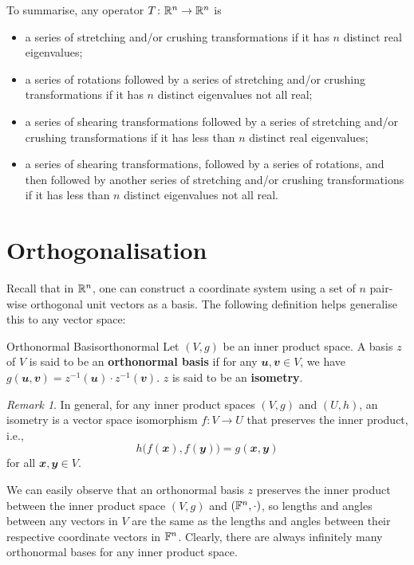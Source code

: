\documentclass[math]{amznotes}
\theoremstyle{remark}
\newtheorem*{remark}{Remark}
\begin{document}
To summarise, any operator $T \colon \mathbb{R}^n \to \mathbb{R}^n$ is 
\begin{itemize}
    \item a series of stretching and/or crushing transformations if it has $n$ distinct real eigenvalues;
    \item a series of rotations followed by a series of stretching and/or crushing transformations if it has $n$ distinct eigenvalues not all real;
    \item a series of shearing transformations followed by a series of stretching and/or crushing transformations if it has less than $n$ distinct real eigenvalues;
    \item a series of shearing transformations, followed by a series of rotations, and then followed by another series of stretching and/or crushing transformations if it has less than $n$ distinct eigenvalues not all real.
\end{itemize}

\section{Orthogonalisation}
Recall that in $\mathbb{R}^n$, one can construct a coordinate system using a set of $n$ pair-wise orthogonal unit vectors as a basis. The following definition helps generalise this to any vector space:
\begin{dfnbox}{Orthonormal Basis}{orthonormal}
    Let $(V, g)$ be an inner product space. A basis $z$ of $V$ is said to be an {\color{red} \textbf{orthonormal basis}} if for any $\mathbfit{u}, \mathbfit{v} \in V$, we have $g(\mathbfit{u}, \mathbfit{v}) = z^{-1}(\mathbfit{u}) \cdot z^{-1}(\mathbfit{v})$. $z$ is said to be an {\color{red} \textbf{isometry}}.
\end{dfnbox}
\begin{notebox}
    \begin{remark}
        In general, for any inner product spaces $(V, g)$ and $(U, h)$, an isometry is a vector space isomorphism $f \colon V \to U$ that preserves the inner product, i.e., 
        \begin{equation*}
            h\bigl(f(\mathbfit{x}), f(\mathbfit{y})\bigr) = g(\mathbfit{x}, \mathbfit{y})
        \end{equation*}
        for all $\mathbfit{x}, \mathbfit{y} \in V$. 
    \end{remark}
\end{notebox}
    We can easily observe that an orthonormal basis $z$ preserves the inner product between the inner product space $(V, g)$ and $(\mathbb{F}^n, \cdot)$, so lengths and angles between any vectors in $V$ are the same as the lengths and angles between their respective coordinate vectors in $\mathbb{F}^n$. Clearly, there are always infinitely many orthonormal bases for any inner product space.
\end{document}
